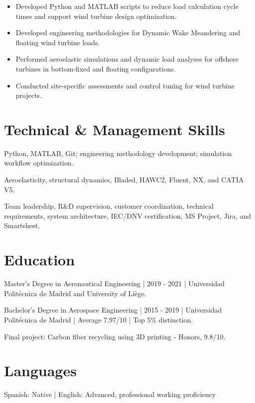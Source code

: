 \begin{itemize}

\item Developed Python and MATLAB scripts to reduce load calculation cycle times and support wind turbine design optimization.

\item Developed engineering methodologies for Dynamic Wake Meandering and floating wind turbine loads.

\item Performed aeroelastic simulations and dynamic load analyses for offshore turbines in bottom-fixed and floating configurations.

\item Conducted site-specific assessments and control tuning for wind turbine projects.

\end{itemize}

\section{Technical \& Management Skills}

Python, MATLAB, Git; engineering methodology development; simulation workflow optimization.\par

Aeroelasticity, structural dynamics, Bladed, HAWC2, Fluent, NX, and CATIA V5.\par

Team leadership, R\&D supervision, customer coordination, technical requirements, system architecture, IEC/DNV certification, MS Project, Jira, and Smartsheet.\par

\section{Education}

Master's Degree in Aeronautical Engineering | 2019 - 2021 | Universidad Politécnica de Madrid and University of Liège.\par

Bachelor's Degree in Aerospace Engineering | 2015 - 2019 | Universidad Politécnica de Madrid | Average 7.97/10 | Top 5\% distinction.\par

Final project: Carbon fiber recycling using 3D printing - Honors, 9.8/10.\par

\section{Languages}
Spanish: Native | English: Advanced, professional working proficiency

